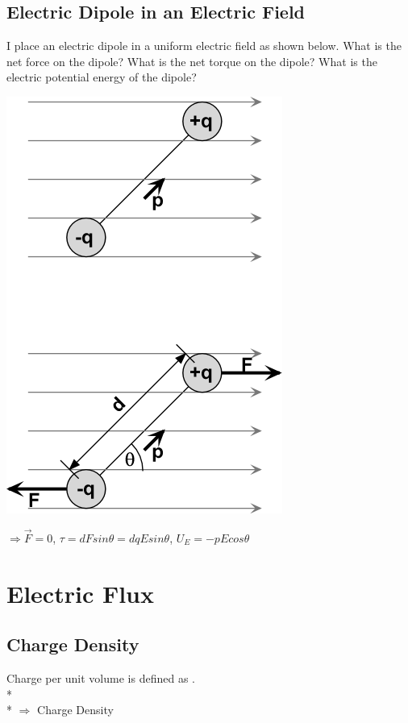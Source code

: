 \documentclass[11pt]{article}
\begin{document}
\pagebreak
\subsection{Electric Dipole in an Electric Field}
I place an electric dipole in a uniform electric field as shown below.  What is the net force on the dipole?  What is the net torque on the dipole?  What is the electric potential energy of the dipole?

\begin{center}
\includegraphics[scale=0.25]{Images/electric_dipole.png}
\end{center}

$\Rightarrow \vec{F} = 0$, \hspace{2mm}$\tau = dFsin\theta = dqEsin\theta$, \hspace{2mm}$U_E = -pEcos\theta$


\pagebreak
\section{Electric Flux}

\subsection{Charge Density}
Charge per unit volume is defined as \underline{\hspace{1cm}}. \\* \\*
$\Rightarrow$ Charge Density
\end{document}
